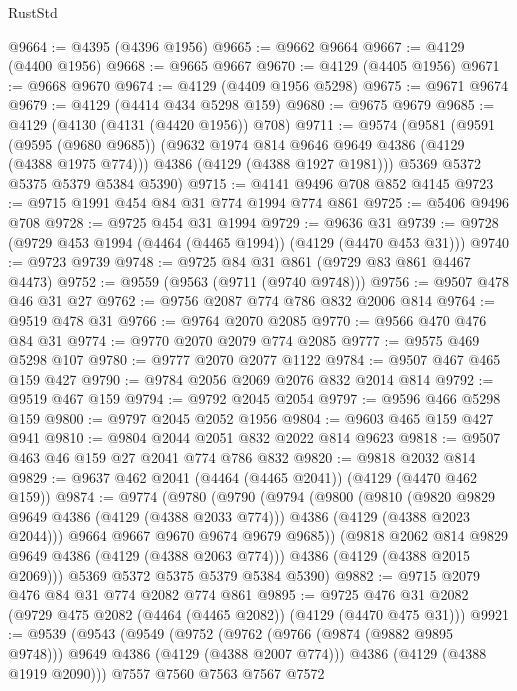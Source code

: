 \begin{lexlean}{RustStd}
\begin{coremodule}
@9664 := @4395 (@4396 @1956)
@9665 := @9662 @9664
@9667 := @4129 (@4400 @1956)
@9668 := @9665 @9667
@9670 := @4129 (@4405 @1956)
@9671 := @9668 @9670
@9674 := @4129 (@4409 @1956 @5298)
@9675 := @9671 @9674
@9679 := @4129 (@4414 @434 @5298 @159)
@9680 := @9675 @9679
@9685 := @4129 (@4130 (@4131 (@4420 @1956)) @708)
@9711 := @9574
    (@9581
      (@9591
        (@9595 (@9680 @9685))
        (@9632 @1974 @814 @9646 @9649 @4386 (@4129 (@4388 @1975 @774)))
        @4386
        (@4129 (@4388 @1927 @1981)))
      @5369
      @5372
      @5375
      @5379
      @5384
      @5390)
@9715 := @4141 @9496 @708 @852 @4145
@9723 := @9715 @1991 @454 @84 @31 @774 @1994 @774 @861
@9725 := @5406 @9496 @708
@9728 := @9725 @454 @31 @1994
@9729 := @9636 @31
@9739 := @9728 (@9729 @453 @1994 (@4464 (@4465 @1994)) (@4129 (@4470 @453 @31)))
@9740 := @9723 @9739
@9748 := @9725 @84 @31 @861 (@9729 @83 @861 @4467 @4473)
@9752 := @9559 (@9563 (@9711 (@9740 @9748)))
@9756 := @9507 @478 @46 @31 @27
@9762 := @9756 @2087 @774 @786 @832 @2006 @814
@9764 := @9519 @478 @31
@9766 := @9764 @2070 @2085
@9770 := @9566 @470 @476 @84 @31
@9774 := @9770 @2070 @2079 @774 @2085
@9777 := @9575 @469 @5298 @107
@9780 := @9777 @2070 @2077 @1122
@9784 := @9507 @467 @465 @159 @427
@9790 := @9784 @2056 @2069 @2076 @832 @2014 @814
@9792 := @9519 @467 @159
@9794 := @9792 @2045 @2054
@9797 := @9596 @466 @5298 @159
@9800 := @9797 @2045 @2052 @1956
@9804 := @9603 @465 @159 @427 @941
@9810 := @9804 @2044 @2051 @832 @2022 @814 @9623
@9818 := @9507 @463 @46 @159 @27 @2041 @774 @786 @832
@9820 := @9818 @2032 @814
@9829 := @9637 @462 @2041 (@4464 (@4465 @2041)) (@4129 (@4470 @462 @159))
@9874 := @9774
    (@9780
      (@9790
        (@9794
          (@9800
            (@9810
              (@9820 @9829 @9649 @4386 (@4129 (@4388 @2033 @774)))
              @4386
              (@4129 (@4388 @2023 @2044)))
            @9664
            @9667
            @9670
            @9674
            @9679
            @9685))
        (@9818 @2062 @814 @9829 @9649 @4386 (@4129 (@4388 @2063 @774)))
        @4386
        (@4129 (@4388 @2015 @2069)))
      @5369
      @5372
      @5375
      @5379
      @5384
      @5390)
@9882 := @9715 @2079 @476 @84 @31 @774 @2082 @774 @861
@9895 := @9725 @476 @31 @2082 (@9729 @475 @2082 (@4464 (@4465 @2082)) (@4129 (@4470 @475 @31)))
@9921 := @9539
    (@9543
      (@9549
        (@9752
          (@9762 (@9766 (@9874 (@9882 @9895 @9748))) @9649 @4386 (@4129 (@4388 @2007 @774)))
          @4386
          (@4129 (@4388 @1919 @2090)))
        @7557
        @7560
        @7563
        @7567
        @7572

\end{coremodule}
\end{lexlean}
